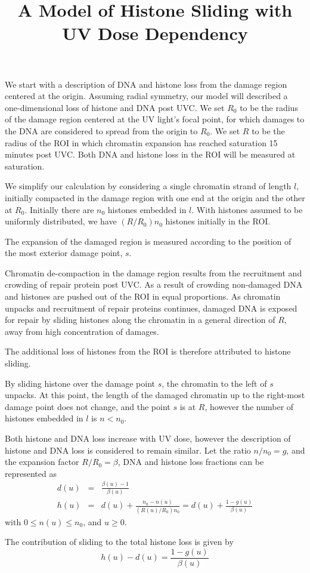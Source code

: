 \documentclass[12pt]{report}
\begin{document}
	\title{A Model of Histone Sliding with UV Dose Dependency}
	\maketitle
	We start with a description of DNA and histone loss from the damage region centered at the origin.
	Assuming radial symmetry, our model will described a one-dimensional loss of histone and DNA post UVC. We set $R_0$ to be the radius of the damage region centered at the UV light's focal point, for which damages to the DNA are considered to spread from the origin to $R_0$. We set $R$ to be the radius of the ROI in which chromatin expansion has reached saturation 15 minutes post UVC. Both DNA and histone loss in the ROI will be measured at saturation. 
	
	We simplify our calculation by considering a single chromatin strand of length $l$, initially compacted in the damage region with one end at the origin and the other at $R_0$. Initially there are $n_0$ histones embedded in $l$. With histones assumed to be uniformly distributed, we have $(R/R_0) n_0$ histones initially in the ROI. 
	
	The expansion of the damaged region is measured according to the position of the most exterior damage point, $s$. 
	
	Chromatin de-compaction  in the damage region results from the recruitment and crowding of repair protein post UVC. As a result of crowding non-damaged DNA and histones are pushed out of the ROI in equal proportions. As chromatin unpacks and recruitment of repair proteins continues, damaged DNA is exposed for repair by sliding histones along the chromatin in a general direction of $R$, away from high concentration of damages. 
	
	The additional loss of histones from the ROI is therefore attributed to histone sliding.  
	 
	By sliding histone over the damage point $s$, the chromatin to the left of $s$ unpacks. At this point, the length of the damaged chromatin up to the right-most damage point does not change, and the point $s$ is at $R$, however the number of histones embedded in $l$ is $n<n_0$. 
	
	Both histone and DNA loss increase with UV dose, however the description of histone and DNA loss is considered to remain similar. Let the ratio $n/n_0 =g$, and the expansion factor $R/R_0=\beta$, DNA and histone loss fractions can be represented as
	\begin{eqnarray}
	d(u) &=& \frac{\beta(u)-1}{\beta(u)}\\
	h(u) &=& d(u) +\frac{n_0-n(u)}{(R(u)/R_0) n_0}=d(u)+\frac{1-g(u)}{\beta(u)}
	\end{eqnarray}
 with $0\leq n(u)\leq n_0$, and $u\geq0$. 
 
The contribution of sliding to the total histone loss is given by
\begin{equation}
h(u)-d(u)=\frac{1-g(u)}{\beta(u)}
\end{equation}
\end{document}
